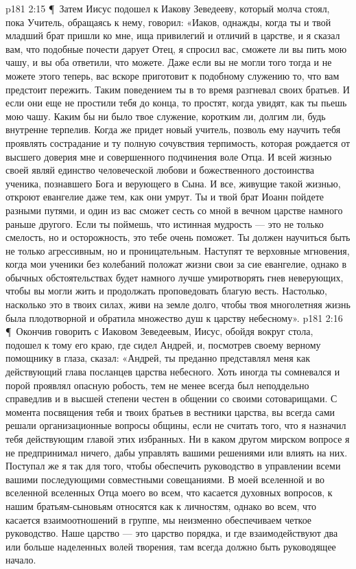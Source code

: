 \vs p181 2:15 \P\ Затем Иисус подошел к Иакову Зеведееву, который молча стоял, пока Учитель, обращаясь к нему, говорил: «Иаков, однажды, когда ты и твой младший брат пришли ко мне, ища привилегий и отличий в царстве, и я сказал вам, что подобные почести дарует Отец, я спросил вас, сможете ли вы пить мою чашу, и вы оба ответили, что можете. Даже если вы не могли того тогда и не можете этого теперь, вас вскоре приготовит к подобному служению то, что вам предстоит пережить. Таким поведением ты в то время разгневал своих братьев. И если они еще не простили тебя до конца, то простят, когда увидят, как ты пьешь мою чашу. Каким бы ни было твое служение, коротким ли, долгим ли, будь внутренне терпелив. Когда же придет новый учитель, позволь ему научить тебя проявлять сострадание и ту полную сочувствия терпимость, которая рождается от высшего доверия мне и совершенного подчинения воле Отца. И всей жизнью своей являй единство человеческой любови и божественного достоинства ученика, познавшего Бога и верующего в Сына. И все, живущие такой жизнью, откроют евангелие даже тем, как они умрут. Ты и твой брат Иоанн пойдете разными путями, и один из вас сможет сесть со мной в вечном царстве намного раньше другого. Если ты поймешь, что истинная мудрость --- это не только смелость, но и осторожность, это тебе очень поможет. Ты должен научиться быть не только агрессивным, но и проницательным. Наступят те верховные мгновения, когда мои ученики без колебаний положат жизни свои за сие евангелие, однако в обычных обстоятельствах будет намного лучше умиротворять гнев неверующих, чтобы вы могли жить и продолжать проповедовать благую весть. Настолько, насколько это в твоих силах, живи на земле долго, чтобы твоя многолетняя жизнь была плодотворной и обратила множество душ к царству небесному».
\vs p181 2:16 \P\ Окончив говорить с Иаковом Зеведеевым, Иисус, обойдя вокруг стола, подошел к тому его краю, где сидел Андрей, и, посмотрев своему верному помощнику в глаза, сказал: «Андрей, ты преданно представлял меня как действующий глава посланцев царства небесного. Хоть иногда ты сомневался и порой проявлял опасную робость, тем не менее всегда был неподдельно справедлив и в высшей степени честен в общении со своими сотоварищами. С момента посвящения тебя и твоих братьев в вестники царства, вы всегда сами решали организационные вопросы общины, если не считать того, что я назначил тебя действующим главой этих избранных. Ни в каком другом мирском вопросе я не предпринимал ничего, дабы управлять вашими решениями или влиять на них. Поступал же я так для того, чтобы обеспечить руководство в управлении всеми вашими последующими совместными совещаниями. В моей вселенной и во вселенной вселенных Отца моего во всем, что касается духовных вопросов, к нашим братьям\hyp{}сыновьям относятся как к личностям, однако во всем, что касается взаимоотношений в группе, мы неизменно обеспечиваем четкое руководство. Наше царство --- это царство порядка, и где взаимодействуют два или больше наделенных волей творения, там всегда должно быть руководящее начало.
